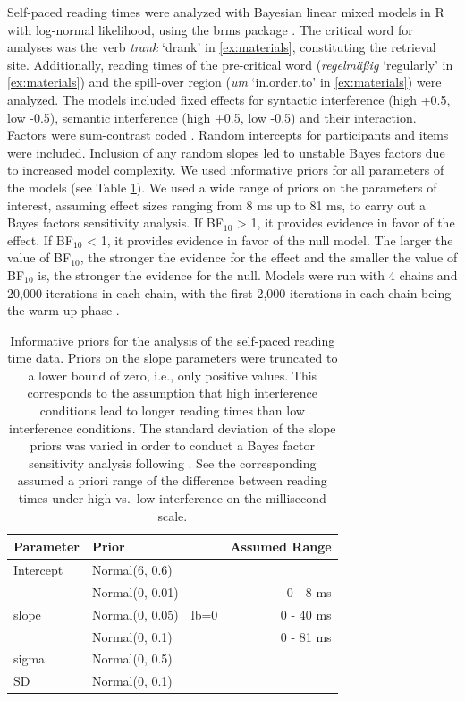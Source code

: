 \documentclass[a4paper, man, floatsintext]{apa7}
\begin{document}
Self-paced reading times were analyzed with Bayesian linear mixed models in R \citep{r} with log-normal likelihood, using the brms package \citep{brms}. The critical word for analyses was the verb \textit{trank} `drank' in \ref{ex:materials}, constituting the retrieval site. Additionally, reading times of the pre-critical word (\textit{regelmäßig} `regularly' in \ref{ex:materials}) and the spill-over region (\textit{um} `in.order.to' in \ref{ex:materials}) were analyzed. 
The models included fixed effects for syntactic interference (high +0.5, low -0.5), semantic interference (high +0.5, low -0.5) and their interaction. Factors were sum-contrast coded \citep{schad_et_al_contrasts}. Random intercepts for participants and items were included. Inclusion of any random slopes led to unstable Bayes factors due to increased model complexity. We used informative priors for all parameters of the models (see Table \ref{tab:spr_priors}). We used a wide range of priors on the parameters of interest, assuming effect sizes ranging from 8 ms up to 81 ms, to carry out a Bayes factors sensitivity analysis. If BF$_{10}$ > 1, it provides evidence in favor of the effect. If BF$_{10}$ < 1, it provides evidence in favor of the null model. The larger the value of BF$_{10}$, the stronger the evidence for the effect and the smaller the value of BF$_{10}$ is, the stronger the evidence for the null. Models were run with 4 chains and 20,000 iterations in each chain, with the first 2,000 iterations in each chain being the warm-up phase \citep{schad_etal_2022_BF}. 

\begin{table}[h]
    \caption{Informative priors for the analysis of the self-paced reading time data. Priors on the slope parameters were truncated to a lower bound of zero, i.e., only positive values. This corresponds to the assumption that high interference conditions lead to longer reading times than low interference conditions. The standard deviation of the slope priors was varied in order to conduct a Bayes factor sensitivity analysis following \citet{schad_etal_2022_BF}. See the corresponding assumed a priori range of the difference between reading times under high vs.\ low interference on the millisecond scale.}
    \label{tab:spr_priors}
    \centering
     \begin{tabular}{lllr}
    \toprule
    Parameter&Prior & &Assumed Range\\
    \midrule
  Intercept & Normal(6, 0.6)& &\\
  \cmidrule{2-4}
  \multirow{3}{1cm}{slope} & Normal(0, 0.01) & \multirow{3}{1cm}{lb=0} & 0 - 8 ms\\
  &  Normal(0, 0.05)& &0 - 40 ms\\
  & Normal(0, 0.1) & &0 - 81 ms\\
  \cmidrule{2-4}
  sigma & Normal(0, 0.5)&&\\
  SD & Normal(0, 0.1)& &\\
  \bottomrule
  \end{tabular}
  \end{table}
\end{document}
